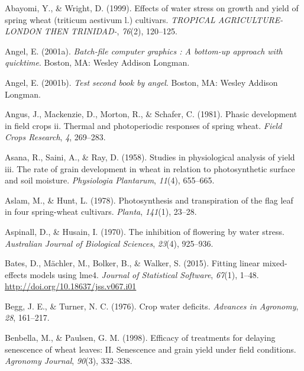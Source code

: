 \documentclass[12pt,oneside]{dukestatscithesis} %
\newlength{\cslhangindent}
\newenvironment{cslreferences}%
  {\setlength{\parindent}{0pt}%
  \everypar{\setlength{\hangindent}{\cslhangindent}}\ignorespaces}%
  {\par}
\begin{document}
\hypertarget{refs}{}
\begin{cslreferences}
\leavevmode\hypertarget{ref-abayomi1999effects}{}%
Abayomi, Y., \& Wright, D. (1999). Effects of water stress on growth and yield of spring wheat (triticum aestivum l.) cultivars. \emph{TROPICAL AGRICULTURE-LONDON THEN TRINIDAD-}, \emph{76}(2), 120--125.

\leavevmode\hypertarget{ref-angel2001}{}%
Angel, E. (2001a). \emph{Batch-file computer graphics : A bottom-up approach with quicktime}. Boston, MA: Wesley Addison Longman.

\leavevmode\hypertarget{ref-angel2002a}{}%
Angel, E. (2001b). \emph{Test second book by angel}. Boston, MA: Wesley Addison Longman.

\leavevmode\hypertarget{ref-angus1981phasic}{}%
Angus, J., Mackenzie, D., Morton, R., \& Schafer, C. (1981). Phasic development in field crops ii. Thermal and photoperiodic responses of spring wheat. \emph{Field Crops Research}, \emph{4}, 269--283.

\leavevmode\hypertarget{ref-asana1958studies}{}%
Asana, R., Saini, A., \& Ray, D. (1958). Studies in physiological analysis of yield iii. The rate of grain development in wheat in relation to photosynthetic surface and soil moisture. \emph{Physiologia Plantarum}, \emph{11}(4), 655--665.

\leavevmode\hypertarget{ref-aslam1978photosynthesis}{}%
Aslam, M., \& Hunt, L. (1978). Photosynthesis and transpiration of the flag leaf in four spring-wheat cultivars. \emph{Planta}, \emph{141}(1), 23--28.

\leavevmode\hypertarget{ref-aspinall1970inhibition}{}%
Aspinall, D., \& Husain, I. (1970). The inhibition of flowering by water stress. \emph{Australian Journal of Biological Sciences}, \emph{23}(4), 925--936.

\leavevmode\hypertarget{ref-bates2014fitting}{}%
Bates, D., Mächler, M., Bolker, B., \& Walker, S. (2015). Fitting linear mixed-effects models using lme4. \emph{Journal of Statistical Software}, \emph{67}(1), 1--48. \url{http://doi.org/10.18637/jss.v067.i01}

\leavevmode\hypertarget{ref-begg1976crop}{}%
Begg, J. E., \& Turner, N. C. (1976). Crop water deficits. \emph{Advances in Agronomy}, \emph{28}, 161--217.

\leavevmode\hypertarget{ref-benbella1998efficacy}{}%
Benbella, M., \& Paulsen, G. M. (1998). Efficacy of treatments for delaying senescence of wheat leaves: II. Senescence and grain yield under field conditions. \emph{Agronomy Journal}, \emph{90}(3), 332--338.


\end{cslreferences}
\end{document}
